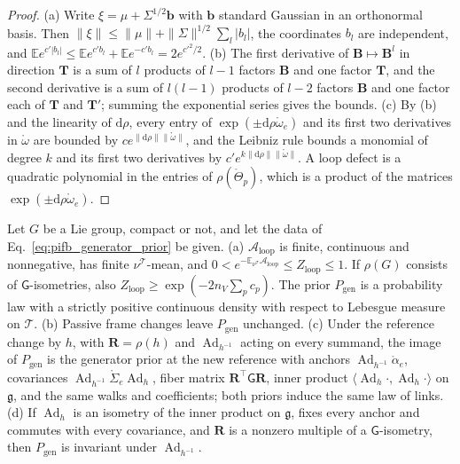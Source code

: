 \begin{proof}
(a) Write $\xi=\mu+\Sigma^{1/2}\mathbf b$ with $\mathbf b$ standard Gaussian in an orthonormal basis. Then $\|\xi\|\leq\|\mu\|+\|\Sigma\|^{1/2}\sum_l|b_l|$, the coordinates $b_l$ are independent, and $\mathbb Ee^{c'|b_l|}\leq\mathbb Ee^{c'b_l}+\mathbb Ee^{-c'b_l}=2e^{c'^2/2}$.
(b) The first derivative of $\mathbf B\mapsto\mathbf B^l$ in direction $\mathbf T$ is a sum of $l$ products of $l-1$ factors $\mathbf B$ and one factor $\mathbf T$, and the second derivative is a sum of $l(l-1)$ products of $l-2$ factors $\mathbf B$ and one factor each of $\mathbf T$ and $\mathbf T'$; summing the exponential series gives the bounds.
(c) By (b) and the linearity of $\mathrm d\rho$, every entry of $\exp(\pm\mathrm d\rho\mathring\omega_e)$ and its first two derivatives in $\mathring\omega$ are bounded by $ce^{\|\mathrm d\rho\|\|\mathring\omega\|}$, and the Leibniz rule bounds a monomial of degree $k$ and its first two derivatives by $c'e^{k\|\mathrm d\rho\|\|\mathring\omega\|}$. A loop defect is a quadratic polynomial in the entries of $\rho(\mathring\Theta_p)$, which is a product of the matrices $\exp(\pm\mathrm d\rho\mathring\omega_e)$.
\end{proof}

\begin{proposition}\label{prop:llp_generator_prior}
Let $G$ be a Lie group, compact or not, and let the data of Eq.~\eqref{eq:pifb_generator_prior} be given.
(a) $\mathcal A_{\mathrm{loop}}$ is finite, continuous and nonnegative, has finite $\nu^{\mathcal T}$-mean, and $0<e^{-\mathbb E_{\nu^{\mathcal T}}\mathcal A_{\mathrm{loop}}}\leq Z_{\mathrm{loop}}\leq1$. If $\rho(G)$ consists of $\mathsf G$-isometries, also $Z_{\mathrm{loop}}\geq\exp(-2n_V\sum_pc_p)$. The prior $P_{\mathrm{gen}}$ is a probability law with a strictly positive continuous density with respect to Lebesgue measure on $\mathcal T$.
(b) Passive frame changes leave $P_{\mathrm{gen}}$ unchanged.
(c) Under the reference change by $h$, with $\mathbf R=\rho(h)$ and $\operatorname{Ad}_{h^{-1}}$ acting on every summand, the image of $P_{\mathrm{gen}}$ is the generator prior at the new reference with anchors $\operatorname{Ad}_{h^{-1}}\mathring\alpha_e$, covariances $\operatorname{Ad}_{h^{-1}}\mathring\Sigma_e\operatorname{Ad}_h$, fiber matrix $\mathbf R^\top\mathsf G\mathbf R$, inner product $\langle\operatorname{Ad}_h\cdot,\operatorname{Ad}_h\cdot\rangle$ on $\mathfrak g$, and the same walks and coefficients; both priors induce the same law of links.
(d) If $\operatorname{Ad}_h$ is an isometry of the inner product on $\mathfrak g$, fixes every anchor and commutes with every covariance, and $\mathbf R$ is a nonzero multiple of a $\mathsf G$-isometry, then $P_{\mathrm{gen}}$ is invariant under $\operatorname{Ad}_{h^{-1}}$.
\end{proposition}

